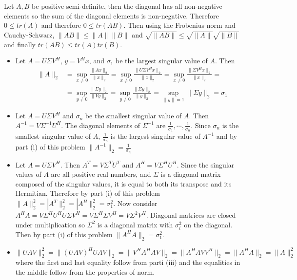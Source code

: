 \documentclass[12pt]{article}
\newenvironment{problem}[2][Problem]{\begin{trivlist}
\item[\hskip \labelsep {\bfseries #1}\hskip \labelsep {\bfseries #2}]}{\end{trivlist}}
\begin{document}
 
\begin{problem}{28.} 
Let $A,B$ be positive semi-definite, then the diagonal has all non-negative elements so the sum of the diagonal elements is non-negative. Therefore $ 0 \leq tr(A)$ and therefore $ 0 \leq tr(AB)$. Then using the Frobenius norm and Cauchy-Schwarz, $\|AB\| \leq \|A\| \|B\|$ and $\sqrt{\|AB\|} \leq \sqrt{\|A\|} \sqrt{\|B\|}$ and finally $tr(AB) \leq tr(A) tr(B)$. 
\end{problem}


\begin{problem}{31.} \hfill
\begin{itemize}
\item [(i)] Let $A = U\Sigma V^H$, $y = V^Hx$, and $\sigma_1$ be the largest singular value of $A$. Then 
\begin{equation*}
\begin{aligned}
\|A\|_2 &= \sup_{x\neq 0} \frac{\|Ax\|_2}{\|x\|_2} = \sup_{x\neq 0} \frac{\|U\Sigma V^Hx\|_2}{\|x\|_2} = \sup_{x\neq 0} \frac{\|\Sigma V^Hx\|_2}{\|x\|_2} = \\
& = \sup_{y\neq 0} \frac{\|\Sigma y\|_2}{\|Vy\|_2} = \sup_{y\neq 0} \frac{\|\Sigma y\|_2}{\|y\|_2} =  \sup_{\|y\|= 1} \|\Sigma y\|_2 = \sigma_1
\end{aligned}
\end{equation*} 
\item [(ii)] Let $A = U\Sigma V^H$ and $\sigma_n$ be the smallest singular value of $A$. Then $A^{-1} = V\Sigma^{-1} U^H$. The diagonal elements of $\Sigma^{-1}$ are $\frac{1}{\sigma_1}, \cdots, \frac{1}{\sigma_n}$. Since $\sigma_n$ is the smallest singular value of $A$, $\frac{1}{\sigma_n}$ is the largest singular value of $A^{-1}$ and by part (i) of this problem $\|A^{-1}\|_2 = \frac{1}{\sigma_n}$
\item [(iii)] Let $A = U\Sigma V^H$. Then $A^T = V\Sigma^T U^T$ and $A^H = V\Sigma^H U^H$. Since the singular values of $A$ are all positive real numbers, and $\Sigma$ is a diagonal matrix composed of the singular values, it is equal to both its transpose and its Hermitian. Therefore by part (i) of this problem $\|A\|_2^2 = |A^T\|_2^2 = |A^H\|_2^2 = \sigma_1^2$.  Now consider $A^HA = V\Sigma^H U^HU\Sigma V^H = V\Sigma^H\Sigma V^H = V\Sigma^2V^H$. Diagonal matrices are closed under multiplication so $\Sigma^2$ is a diagonal matrix with $\sigma_i^2$ on the diagonal. Then by part (i) of this problem $\|A^HA\|_2 = \sigma_1^2$. 
\item [(iv)] $\|UAV\|^2_2 = \|(UAV)^HUAV\|_2 = \|V^HA^HAV\|_2 =  \|A^HAVV^H\|_2 = \|A^HA\|_2 = \|A\|^2_2$ where the first and last equality follow from parti (iii) and the equalities in the middle follow from the properties of norm. 
\end{itemize}
\end{problem}
\end{document}
